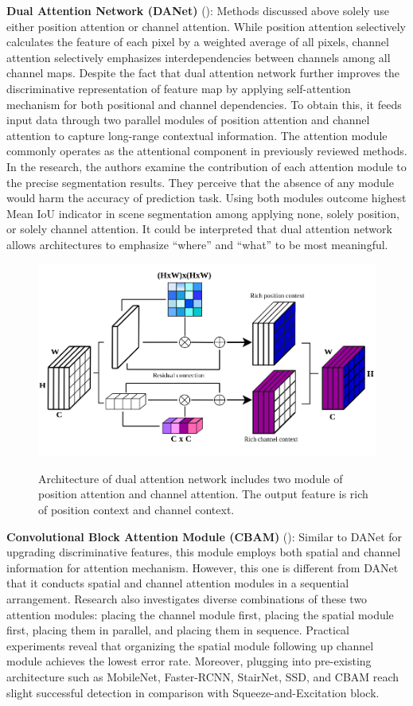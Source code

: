 \textbf{Dual Attention Network (DANet)} (\textcolor{cyan}{\cite{fu2019dual}}):
Methods discussed above solely use either position attention or channel attention. While position attention selectively calculates the feature of each pixel by a weighted average of all pixels, channel attention selectively emphasizes interdependencies between channels among all channel maps. Despite the fact that dual attention network further improves the discriminative representation of feature map by applying self-attention mechanism for both positional and channel dependencies. To obtain this, it feeds input data through two parallel modules of position attention and channel attention to capture long-range contextual information. The attention module commonly operates as the attentional component in previously reviewed methods. In the research, the authors examine the contribution of each attention module to the precise segmentation results. They perceive that the absence of any module would harm the accuracy of prediction task. Using both modules outcome highest Mean IoU indicator in scene segmentation among applying none, solely position, or solely channel attention. It could be interpreted that dual attention network allows architectures to emphasize “where” and “what” to be most meaningful. 
\begin{figure}[h!]
	\centering
	\includegraphics[width = 0.65\linewidth]{figs/Dual_attention.png}
	\label{fig:Dual_attention}
	\caption{Architecture of dual attention network includes two module of position attention and channel attention. The output feature is rich of position context and channel context.}
\end{figure}

\textbf{Convolutional Block Attention Module (CBAM)} (\textcolor{cyan}{\cite{woo2018cbam}}):
Similar to DANet for upgrading discriminative features, this module employs both spatial and channel information for attention mechanism. However, this one is different from DANet that it conducts spatial and channel attention modules in a sequential arrangement. Research also investigates diverse combinations of these two attention modules: placing the channel module first, placing the spatial module first, placing them in parallel, and placing them in sequence. Practical experiments reveal that organizing the spatial module following up channel module achieves the lowest error rate. Moreover, plugging into pre-existing architecture such as MobileNet, Faster-RCNN, StairNet, SSD, and CBAM reach slight successful detection in comparison with Squeeze-and-Excitation block.

